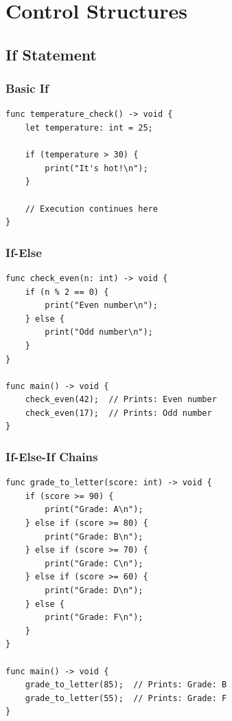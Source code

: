 \documentclass[12pt,a4paper,oneside]{book}
\begin{document}
\chapter{Control Structures}

\section{If Statement}

\subsection{Basic If}

\begin{lstlisting}[style=algo, caption={Simple If Statement}]
func temperature_check() -> void {
    let temperature: int = 25;
    
    if (temperature > 30) {
        print("It's hot!\n");
    }
    
    // Execution continues here
}
\end{lstlisting}

\subsection{If-Else}

\begin{lstlisting}[style=algo, caption={If-Else Statement}]
func check_even(n: int) -> void {
    if (n % 2 == 0) {
        print("Even number\n");
    } else {
        print("Odd number\n");
    }
}

func main() -> void {
    check_even(42);  // Prints: Even number
    check_even(17);  // Prints: Odd number
}
\end{lstlisting}

\subsection{If-Else-If Chains}

\begin{lstlisting}[style=algo, caption={Multiple Conditions}]
func grade_to_letter(score: int) -> void {
    if (score >= 90) {
        print("Grade: A\n");
    } else if (score >= 80) {
        print("Grade: B\n");
    } else if (score >= 70) {
        print("Grade: C\n");
    } else if (score >= 60) {
        print("Grade: D\n");
    } else {
        print("Grade: F\n");
    }
}

func main() -> void {
    grade_to_letter(85);  // Prints: Grade: B
    grade_to_letter(55);  // Prints: Grade: F
}
\end{lstlisting}
\end{document}
